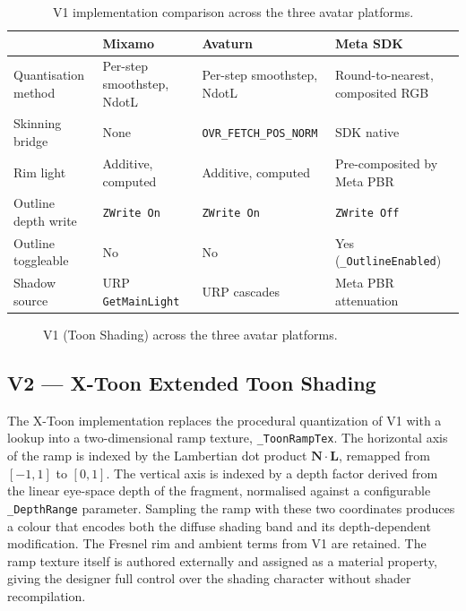 \begin{table}[H]
  \centering
  \caption{V1 implementation comparison across the three avatar platforms.}
  \label{tab:v1_comparison}
  \small
  \begin{tabularx}{\textwidth}{lXXX}
    \toprule
    & \textbf{Mixamo} & \textbf{Avaturn} & \textbf{Meta SDK} \\
    \midrule
    Quantisation method & Per-step smoothstep, NdotL & Per-step smoothstep, NdotL & Round-to-nearest, composited RGB \\
    Skinning bridge & None & \texttt{OVR\_FETCH\_POS\_NORM} & SDK native \\
    Rim light & Additive, computed & Additive, computed & Pre-composited by Meta PBR \\
    Outline depth write & \texttt{ZWrite On} & \texttt{ZWrite On} & \texttt{ZWrite Off} \\
    Outline toggleable & No & No & Yes (\texttt{\_OutlineEnabled}) \\
    Shadow source & URP \texttt{GetMainLight} & URP cascades & Meta PBR attenuation \\
    \bottomrule
  \end{tabularx}
\end{table}

\begin{figure}[H]
  \centering
  \caption{V1 (Toon Shading) across the three avatar platforms.}
  \label{fig:v1_impl}
\end{figure}

\subsection{V2 — X-Toon Extended Toon Shading}
\label{sec:impl_v2}

The X-Toon implementation replaces the procedural quantization of V1 with a lookup into a two-dimensional ramp texture, \texttt{\_ToonRampTex}. The horizontal axis of the ramp is indexed by the Lambertian dot product $\mathbf{N} \cdot \mathbf{L}$, remapped from $[-1, 1]$ to $[0, 1]$. The vertical axis is indexed by a depth factor derived from the linear eye-space depth of the fragment, normalised against a configurable \texttt{\_DepthRange} parameter. Sampling the ramp with these two coordinates produces a colour that encodes both the diffuse shading band and its depth-dependent modification. The Fresnel rim and ambient terms from V1 are retained. The ramp texture itself is authored externally and assigned as a material property, giving the designer full control over the shading character without shader recompilation.


